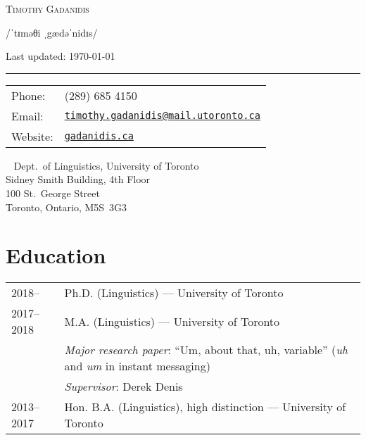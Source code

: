 \documentclass[letterpaper]{article}
\def\name{Timothy Gadanidis}
\begin{document}
\thispagestyle{plain}

\centerline{\Huge \scshape \name}
\vspace{0.2em}
\centerline{\large /ˈtɪməθi ˌgædəˈnidɪs/}
\vspace{0.2em}
\centerline{\footnotesize Last updated: \today}

\medskip\hrule height 1pt

\vspace{0.25in}

\begin{tabular}{ll}
    Phone: & (289) 685 4150 \\
    Email: & \href{mailto:timothy.gadanidis@mail.utoronto.ca}%
    {\texttt{timothy.gadanidis@mail.utoronto.ca}} \\
    Website: & \href{http://www.gadanidis.ca}{\texttt{gadanidis.ca}}
\end{tabular}%
\hfill%
\begin{minipage}{0.4\linewidth}
    \raggedright\
    {%
        \hfill Dept.\ of Linguistics, University of Toronto\\
        \hfill Sidney Smith Building, 4th Floor\\
        \hfill 100 St.\ George Street\\
        \hfill Toronto, Ontario, M5S~3G3\\
    }
\end{minipage}

\section*{Education}
\begin{longtable}{p{}p{}}
    2018-- & Ph.D. (Linguistics) --- University of Toronto \\
    2017--2018 & M.A. (Linguistics) --- University of Toronto \\
               & \hspace{1em}\emph{Major research paper}: ``Um, about that, uh, variable''
                 (\emph{uh} and \emph{um} in instant messaging) \\
               & \hspace{1em}\emph{Supervisor}: Derek Denis \\
    2013--2017 & Hon. B.A. (Linguistics), high distinction --- University
    of Toronto \\
\end{longtable}
\end{document}
